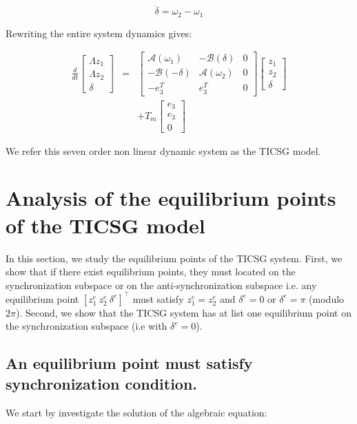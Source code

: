 \documentclass[letterpaper, 10 pt, conference]{ieeeconf}  %
\begin{document}
\[
\dot{\delta}=\omega_{2}-\omega_{1}
\]

Rewriting the entire system dynamics gives:

\begin{equation}
\begin{array}{ccc}
\frac{d}{dt}\left[\begin{array}{c}
\varLambda z_{1}\\
\varLambda z_{2}\\
\delta
\end{array}\right] & = & \left[\begin{array}{c|c|c}
\mathcal{A}(\omega_{1}) & -\mathcal{B}(\delta) & 0\\
\hline -\mathcal{B}(-\delta) & \mathcal{A}(\omega_{2}) & 0\\
\hline -e_{3}^{T} & e_{3}^{T} & 0
\end{array}\right]\left[\begin{array}{c}
z_{1}\\
z_{2}\\
\delta
\end{array}\right]\\
 &  & +T_{m}\left[\begin{array}{c}
e_{3}\\
e_{3}\\
0
\end{array}\right]
\end{array}\label{eq:TICSGDynamics}
\end{equation}

We refer this seven order non linear dynamic system as the TICSG model.

\section{Analysis of the equilibrium points of the TICSG model \label{sec:equivalence_pont}}

In this section, we study the equilibrium points of the TICSG system. First, we show that  if there exist equilibrium points, they must located on the synchronization subspace or on the anti-synchronization subspace i.e. any equilibrium point $\left[z_1^e \ z_2^e \ \delta^e \right]^\top$ must satisfy $z_1^e=z_2^e$ and $\delta^e=0$ or $\delta^e = \pi$   (modulo $2\pi$). Second, we show that the TICSG system has at list one equilibrium point on the synchronization subspace (i.e with $\delta^e=0$).

\subsection{An equilibrium point must satisfy synchronization condition.}
We  start by investigate the solution of the algebraic equation:  
\end{document}
